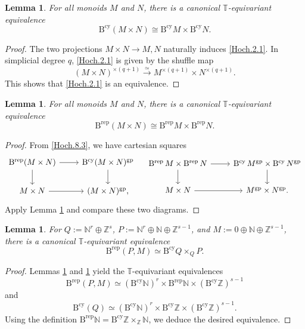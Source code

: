\documentclass[11pt, a4paper]{amsart}
\newtheorem{lem}[thm]{Lemma}
\theoremstyle{definition}
\numberwithin{equation}{subsection}
\newcommand{\N}{\mathbb{N}}
\newcommand{\Z}{\mathbb{Z}}
\newcommand{\Brep}{\operatorname{B^{rep}}}
\newcommand{\Bcy}{\operatorname{B^{cy}}}
\newcommand{\gp}{{\mathrm{gp}}}
\begin{document}
\begin{lem}
\label{Hoch.2}
For all monoids $M$ and $N$, there is a canonical $\mathbb{T}$-equivariant equivalence
\begin{equation}
\label{Hoch.2.1}
\Bcy (M\times N) \cong \Bcy M \times \Bcy N.
\end{equation}
\end{lem}
\begin{proof}
The two projections $M\times N\to M,N$ naturally induces \eqref{Hoch.2.1}.
In simplicial degree $q$, \eqref{Hoch.2.1} is given by the shuffle map
\[
(M\times N)^{\times (q+1)}
\xrightarrow{\simeq}
M^{\times (q+1)} \times N^{\times (q+1)}.
\]
This shows that \eqref{Hoch.2.1} is an equivalence.
\end{proof}

\begin{lem}
\label{Hoch.3}
For all monoids $M$ and $N$, there is a canonical  $\mathbb{T}$-equivariant equivalence
\[
 \Brep (M\times N) \cong \Brep M \times \Brep N.
\]
\end{lem}
\begin{proof}
From \eqref{Hoch.8.3}, we have cartesian squares
\[
\begin{tikzcd}
\Brep (M\times N) \arrow[d]\arrow[r]&
\Bcy (M\times N)^{\gp}\arrow[d]
\\
M\times N\arrow[r]&
(M\times N)^{\gp},
\end{tikzcd}
\quad
\begin{tikzcd}
\Brep M\times \Brep N \arrow[d]\arrow[r]&
\Bcy M^{\gp}\times \Bcy N^{\gp}\arrow[d]
\\
M\times N\arrow[r]&
M^{\gp}\times N^{\gp}.
\end{tikzcd}
\]
Apply Lemma \ref{Hoch.2} and compare these two diagrams.
\end{proof}

\begin{lem}
\label{Hoch.14}
For $Q:=\N^r\oplus \Z^s$, $P:=\N^r \oplus \N \oplus \Z^{s-1}$, and $M:=0\oplus \N \oplus \Z^{s-1}$, 
there is a canonical $\mathbb{T}$-equivariant equivalence
\[
\Brep(P,M)
\simeq
\Bcy Q\times_Q P.
\]
\end{lem}
\begin{proof}
Lemmas \ref{Hoch.2} and \ref{Hoch.3} yield the $\mathbb{T}$-equivariant equivalences
\[
\Brep (P,M)
\simeq
(\Bcy \N)^r \times \Brep \N \times (\Bcy \Z)^{s-1}
\]
and
\[
\Bcy(Q)
\simeq
(\Bcy \N)^r \times \Bcy \Z \times (\Bcy \Z)^{s-1}.
\]
Using the definition $\Brep \N = \Bcy \Z \times_{\Z} \N$, we deduce the desired equivalence.
\end{proof}
\end{document}
